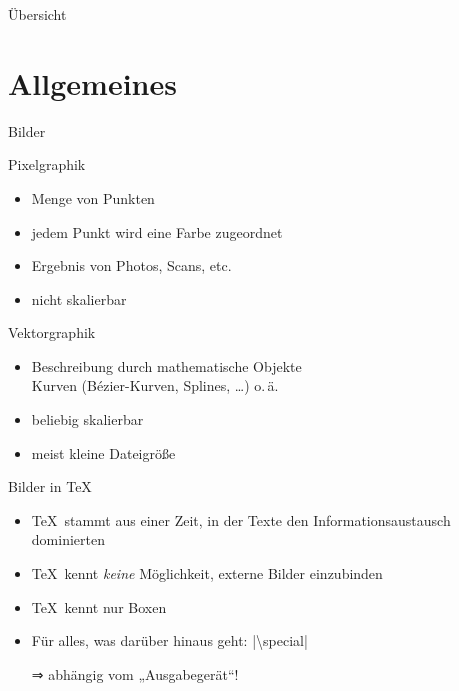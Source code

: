 \documentclass[
	vorläufig=true,
	datum=2017-11-24,
	titel={Grafiken, Abbildungen, TikZ},
	web=true,
	mo,
]{../tex/latexkurs-slides}
\begin{document}
\begin{frame}{Übersicht}
	\tableofcontents
\end{frame}


\section{Allgemeines}
\begin{frame}{Bilder}
	\begin{block}{Pixelgraphik}
		\begin{itemize}
			\item Menge von Punkten
			\item jedem Punkt wird eine Farbe zugeordnet
			\item Ergebnis von Photos, Scans, etc. 
			\item nicht skalierbar
		\end{itemize}
	\end{block}
	\begin{block}{Vektorgraphik}
		\begin{itemize}
			\item Beschreibung durch mathematische Objekte
			\\ Kurven (Bézier-Kurven, Splines, …) o.\,ä.
			\item beliebig skalierbar
			\item meist kleine Dateigröße
		\end{itemize}
	\end{block}
\end{frame}

\begin{frame}{Bilder in \TeX}
	\begin{itemize}
		\item \TeX\ stammt aus einer Zeit, in der Texte den Informationsaustausch dominierten
		\item \TeX\ kennt \emph{keine} Möglichkeit, externe Bilder einzubinden
		\item \TeX\ kennt nur Boxen
		\item Für alles, was darüber hinaus geht: |\textbackslash special|
		\item[⇒] abhängig vom „Ausgabegerät“!
	\end{itemize}
\end{frame}
\end{document}

